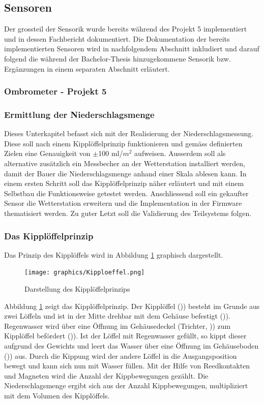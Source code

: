 \subsection{Sensoren}
\label{subsec:Sensoren}
Der grossteil der Sensorik wurde bereits während des Projekt 5 implementiert und in dessen Fachbericht dokumentiert. Die Dokumentation der bereits implementierten Sensoren wird in nachfolgendem Abschnitt inkludiert und darauf folgend die während der Bachelor-Thesis hinzugekommene Sensorik bzw. Ergänzungen in einem separaten Abschnitt erläutert.

\subsubsection{Ombrometer - Projekt 5}

\subsubsection*{\textbf{Ermittlung der Niederschlagsmenge}}
Dieses Unterkapitel befasst sich mit der Realisierung der Niederschlagsmessung. Diese soll nach einem Kipplöffelprinzip funktionieren und gemäss definierten Zielen eine Genauigkeit von $\pm$100 ml/$m^2$ aufweisen. Ausserdem soll als alternative zusätzlich ein Messbecher an der Wetterstation installiert werden, damit der Bauer die Niederschlagsmenge anhand einer Skala ablesen kann. In einem ersten Schritt soll das Kipplöffelprinzip näher erläutert und mit einem Selbstbau die Funktionsweise getestet werden. Anschliessend soll ein gekaufter Sensor die Wetterstation erweitern und die Implementation in der Firmware thematisiert werden. Zu guter Letzt soll die Validierung des Teilsystems folgen.
\subsubsection*{\textbf{Das Kipplöffelprinzip}}
Das Prinzip des Kipplöffels wird in Abbildung \ref{fig:Kipp} graphisch dargestellt.

\begin{figure}[h]
\centering
\texttt{[image: graphics/Kipploeffel.png]}
\caption{Darstellung des Kipplöffelprinzips}
\label{fig:Kipp}
\end{figure}

Abbildung \ref{fig:Kipp} zeigt das Kipplöffelprinzip. Der Kipplöffel ()\grqq) besteht im Grunde aus zwei Löffeln und ist in der Mitte drehbar mit dem Gehäuse befestigt ()\grqq). Regenwasser wird über eine Öffnung im Gehäusedeckel (Trichter, )\grqq) zum Kipplöffel befördert ()\grqq). Ist der Löffel mit Regenwasser gefüllt, so kippt dieser aufgrund des Gewichts und leert das Wasser über eine Öffnung im Gehäuseboden ()\grqq) aus. Durch die Kippung wird der andere Löffel in die Ausgangsposition bewegt und kann sich nun mit Wasser füllen. Mit der Hilfe von Reedkontakten und Magneten wird die Anzahl der Kippbewegungen gezählt. Die Niederschlagsmenge ergibt sich aus der Anzahl Kippbewegungen, multipliziert mit dem Volumen des Kipplöffels.
\newpage


